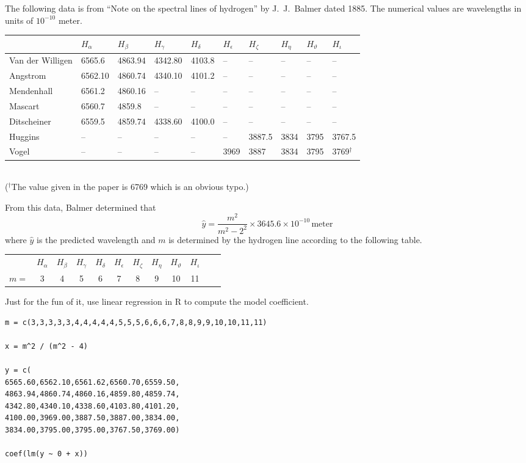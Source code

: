 \documentclass[12pt]{article}
\begin{document}
\noindent
The following data is from
``Note on the spectral lines of hydrogen''
by J.~J.~Balmer dated 1885.
The numerical values are wavelengths in units of $10^{-10}$ meter.

\begin{center}
\footnotesize
\begin{tabular}{|l|l|l|l|l|l|l|l|l|l|}
\hline
 & $H_\alpha$ & $H_\beta$ & $H_\gamma$ & $H_\delta$ & $H_\epsilon$ &
$H_\zeta$ & $H_\eta$ & $H_\vartheta$ & $H_\iota$
\\
\hline
Van der Willigen & 6565.6 & 4863.94 & 4342.80 & 4103.8 & -- & -- & -- & -- & --
\\
Angstrom & 6562.10 & 4860.74 & 4340.10 & 4101.2 & -- & -- & -- & -- & --
\\
Mendenhall & 6561.2 & 4860.16 & -- & -- & -- & -- & -- & -- & --
\\
Mascart & 6560.7 & 4859.8 & -- & -- & -- & -- & -- & -- & --
\\
Ditscheiner & 6559.5 & 4859.74 & 4338.60 & 4100.0 & -- & -- & -- & -- & --
\\
Huggins & -- & -- & -- & -- & -- & 3887.5 & 3834 & 3795 & 3767.5
\\
Vogel & -- & -- & -- & -- & 3969 & 3887 & 3834 & 3795 & 3769${}^\dag$
\\
\hline
\end{tabular}
\\
{\footnotesize(${}^\dag$The value given in the paper is 6769 which is an obvious typo.)}
\end{center}

\noindent
From this data, Balmer determined that
\begin{equation*}
\hat{y}=\frac{m^2}{m^2-2^2}\times3645.6\times10^{-10}\,\text{meter}
\end{equation*}
where $\hat{y}$ is the predicted wavelength and $m$ is determined by the hydrogen line
according to the following table.
\begin{center}
\begin{tabular}{cccccccccccc}
& $H_\alpha$ & $H_\beta$ & $H_\gamma$ & $H_\delta$ & $H_\epsilon$ &
$H_\zeta$ & $H_\eta$ & $H_\vartheta$ & $H_\iota$
\\
$m=$ & 3 & 4 & 5 & 6 & 7 & 8 & 9 & 10 & 11
\end{tabular}
\end{center}

\noindent
Just for the fun of it, use linear regression in R to compute the model coefficient.
{\footnotesize\color{blue}
\begin{verbatim}
m = c(3,3,3,3,3,4,4,4,4,4,5,5,5,6,6,6,7,8,8,9,9,10,10,11,11)

x = m^2 / (m^2 - 4)

y = c(
6565.60,6562.10,6561.62,6560.70,6559.50,
4863.94,4860.74,4860.16,4859.80,4859.74,
4342.80,4340.10,4338.60,4103.80,4101.20,
4100.00,3969.00,3887.50,3887.00,3834.00,
3834.00,3795.00,3795.00,3767.50,3769.00)

coef(lm(y ~ 0 + x))
\end{verbatim}
}
\end{document}
